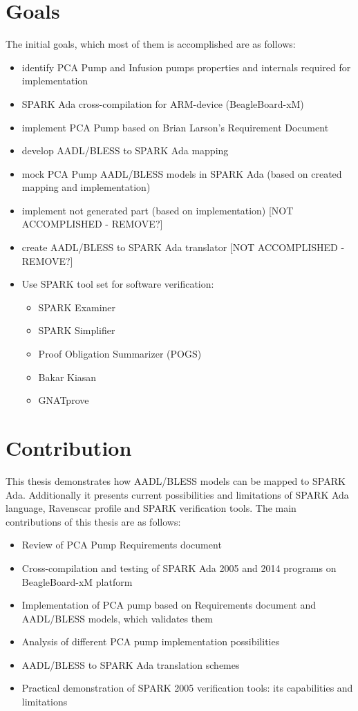 \section{Goals}
\label{introduction:goals}
The initial goals, which most of them is accomplished are as follows:
\begin{itemize}
	\item identify PCA Pump and Infusion pumps properties and internals required for implementation
	\item SPARK Ada cross-compilation for ARM-device (BeagleBoard-xM)
	\item implement PCA Pump based on Brian Larson's Requirement Document \cite{OpenSourcePCAPump:Paper}
	\item develop AADL/BLESS to SPARK Ada mapping
	\item mock PCA Pump AADL/BLESS models in SPARK Ada (based on created mapping and implementation)
	\item implement not generated part (based on implementation) [NOT ACCOMPLISHED - REMOVE?]
	\item create AADL/BLESS to SPARK Ada translator [NOT ACCOMPLISHED - REMOVE?]
	\item Use SPARK tool set for software verification:
		\begin{itemize}
			\item SPARK Examiner
			\item SPARK Simplifier
			\item Proof Obligation Summarizer (POGS)
			\item Bakar Kiasan
			\item GNATprove
		\end{itemize}
\end{itemize}


\section{Contribution}
\label{introduction:contribution}
This thesis demonstrates how AADL/BLESS models can be mapped to SPARK Ada. Additionally it presents current possibilities and limitations of SPARK Ada language, Ravenscar profile and SPARK verification tools. The main contributions of this thesis are as follows:
\begin{itemize}
	\item Review of PCA Pump Requirements document \cite{OpenSourcePCAPump:Paper}
	\item Cross-compilation and testing of SPARK Ada 2005 and 2014 programs on BeagleBoard-xM platform
	\item Implementation of PCA pump based on Requirements document \cite{OpenSourcePCAPump:Paper} and AADL/BLESS models, which validates them
	\item Analysis of different PCA pump implementation possibilities
	\item AADL/BLESS to SPARK Ada translation schemes
	\item Practical demonstration of SPARK 2005 verification tools: its capabilities and limitations
\end{itemize}



